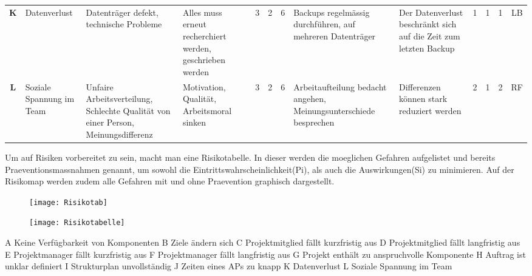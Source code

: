 \begin{table}[H]
{\begin{tabular}{c|>{\HY\RaggedRight}p{2.5cm}|>{\HY\RaggedRight}p{2.5cm}|>{\HY\RaggedRight}p{2.5cm}|c|c|c|>{\HY\RaggedRight}p{3cm}|>{\HY\RaggedRight}p{3cm}|c|c|c|c}
\textbf{K}			&Datenverlust									&Datenträger defekt, technische Probleme												&Alles muss erneut recherchiert werden, geschrieben werden		&3			&2			&\cellcolor{orange}6				&Backups regelmässig durchführen, auf mehreren Datenträger												&Der Datenverlust beschränkt sich auf die Zeit zum letzten Backup												&1				&1				&\cellcolor{dgruen}1		&LB\\
\rowcolor{grau}
\textbf{L}			&Soziale Spannung im Team						&Unfaire Arbeitsverteilung, Schlechte Qualität von einer Person, Meinungsdifferenz		&Motivation, Qualität, Arbeitsmoral sinken						&3			&2			&\cellcolor{orange}6				&Arbeitaufteilung bedacht angehen, Meinungsunterschiede besprechen										&Differenzen können stark reduziert werden																	&2				&1				&\cellcolor{hgruen}2		&RF\\
\end{tabular}
}
\end{table}


\newpage
Um auf Risiken vorbereitet zu sein, macht man eine Risikotabelle. In dieser werden die moeglichen Gefahren aufgelistet und bereits Praeventionsmassnahmen genannt, um sowohl die Eintrittswahrscheinlichkeit(Pi), als auch die Auswirkungen(Si) zu minimieren. Auf der Risikomap werden zudem alle Gefahren mit und ohne Praevention graphisch dargestellt.

\begin{figure}[H]
	\centering
	\texttt{[image: Risikotab]}
	\label{fig:Risikodiagramm}
\end{figure}

\begin{figure}[H]
	\centering
	\texttt{[image: Risikotabelle]}
	\label{fig:Tabelle}
\end{figure}
A 	Keine Verfügbarkeit von Komponenten \newline 
B 	Ziele ändern sich\newline 
C 	Projektmitglied fällt kurzfristig aus\newline 
D	Projektmitglied fällt langfristig aus\newline 
E 	Projektmanager fällt kurzfristig aus\newline 
F 	Projektmanager fällt langfristig aus\newline 
G	Projekt enthält zu anspruchvolle Komponente\newline 
H	Auftrag ist unklar definiert\newline 
I	Strukturplan unvollständig\newline 
J	Zeiten eines APs zu knapp\newline 
K	Datenverlust\newline 
L	Soziale Spannung im Team\newline 
